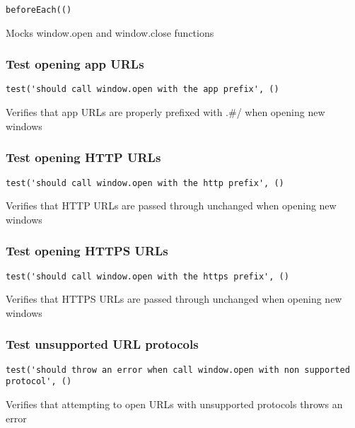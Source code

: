 \documentclass[a4paper]{article}
\begin{document}
\begin{lstlisting}
beforeEach(()
\end{lstlisting}

Mocks window.open and window.close functions

\hypertarget{toc288}{}
\subsubsection{Test opening app URLs}

\begin{lstlisting}
test('should call window.open with the app prefix', ()
\end{lstlisting}

Verifies that app URLs are properly prefixed with .\#/
when opening new windows

\hypertarget{toc289}{}
\subsubsection{Test opening HTTP URLs}

\begin{lstlisting}
test('should call window.open with the http prefix', ()
\end{lstlisting}

Verifies that HTTP URLs are passed through unchanged
when opening new windows

\hypertarget{toc290}{}
\subsubsection{Test opening HTTPS URLs}

\begin{lstlisting}
test('should call window.open with the https prefix', ()
\end{lstlisting}

Verifies that HTTPS URLs are passed through unchanged
when opening new windows

\hypertarget{toc291}{}
\subsubsection{Test unsupported URL protocols}

\begin{lstlisting}
test('should throw an error when call window.open with non supported protocol', ()
\end{lstlisting}

Verifies that attempting to open URLs with unsupported protocols
throws an error
\end{document}
